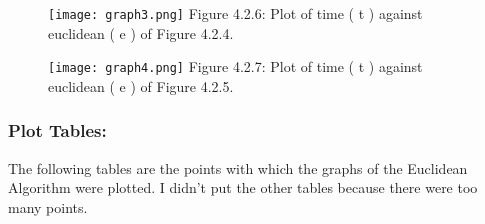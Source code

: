 \documentclass[10pt,a4paper]{article}
\begin{document}
\begin{multicols}{2}
\begin{figure}[H]
\texttt{[image: graph3.png]}
\centering \linebreak \linebreak Figure 4.2.6: Plot of time ( t ) against euclidean ( e ) of Figure 4.2.4.
\end{figure}

\begin{figure}[H]
\texttt{[image: graph4.png]}
\centering \linebreak \linebreak Figure 4.2.7: Plot of time ( t ) against euclidean ( e ) of Figure 4.2.5.
\end{figure}
\end{multicols} \pagebreak

\subsubsection{Plot Tables:}

The following tables are the points with which the graphs of the Euclidean Algorithm were plotted. I didn't put the other tables because there were too many points.
	
\end{document}
